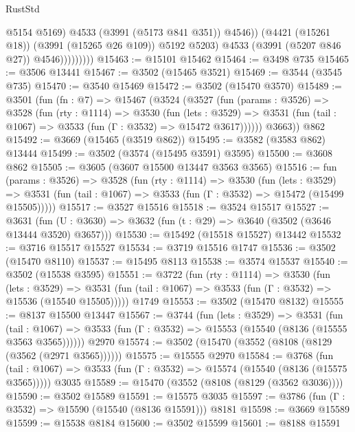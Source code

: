 \begin{lexlean}{RustStd}
\begin{coremodule}
                              @5154
                              @5169)
                            @4533
                            (@3991 (@5173 @841 @351))
                            @4546))
                        (@4421 (@15261 @18))
                        (@3991 (@15265 @26 @109))
                        @5192
                        @5203)
                      @4533
                      (@3991 (@5207 @846 @27))
                      @4546)))))))))
@15463 := @15101 @15462
@15464 := @3498 @735
@15465 := @3506 @13441
@15467 := @3502 (@15465 @3521)
@15469 := @3544 (@3545 @735)
@15470 := @3540 @15469
@15472 := @3502 (@15470 @3570)
@15489 := @3501
    (fun (fn : @7) =>
    @15467
      (@3524
        (@3527
          (fun (params : @3526) =>
          @3528
            (fun (rty : @1114) =>
            @3530
              (fun (lets : @3529) =>
              @3531 (fun (tail : @1067) => @3533 (fun (Γ : @3532) => @15472 @3617))))))
        @3663))
    @862
@15492 := @3669 (@15465 (@3519 @862))
@15495 := @3582 (@3583 @862) @13444
@15499 := @3502 (@3574 (@15495 @3591) @3595)
@15500 := @3608 @862
@15505 := @3605 (@3607 @15500 @13447 @3563 @3565)
@15516 := fun (params : @3526) =>
  @3528
    (fun (rty : @1114) =>
    @3530
      (fun (lets : @3529) =>
      @3531 (fun (tail : @1067) => @3533 (fun (Γ : @3532) => @15472 (@15499 @15505)))))
@15517 := @3527 @15516
@15518 := @3524 @15517
@15527 := @3631
    (fun (U : @3630) => @3632 (fun (t : @29) => @3640 (@3502 (@3646 @13444 @3520) @3657)))
@15530 := @15492 (@15518 @15527) @13442
@15532 := @3716 @15517 @15527
@15534 := @3719 @15516 @1747
@15536 := @3502 (@15470 @8110)
@15537 := @15495 @8113
@15538 := @3574 @15537
@15540 := @3502 (@15538 @3595)
@15551 := @3722
    (fun (rty : @1114) =>
    @3530
      (fun (lets : @3529) =>
      @3531 (fun (tail : @1067) => @3533 (fun (Γ : @3532) => @15536 (@15540 @15505)))))
    @1749
@15553 := @3502 (@15470 @8132)
@15555 := @8137 @15500 @13447
@15567 := @3744
    (fun (lets : @3529) =>
    @3531
      (fun (tail : @1067) =>
      @3533 (fun (Γ : @3532) => @15553 (@15540 (@8136 (@15555 @3563 @3565))))))
    @2970
@15574 := @3502 (@15470 (@3552 (@8108 (@8129 (@3562 (@2971 @3565))))))
@15575 := @15555 @2970
@15584 := @3768
    (fun (tail : @1067) => @3533 (fun (Γ : @3532) => @15574 (@15540 (@8136 (@15575 @3565)))))
    @3035
@15589 := @15470 (@3552 (@8108 (@8129 (@3562 @3036))))
@15590 := @3502 @15589
@15591 := @15575 @3035
@15597 := @3786 (fun (Γ : @3532) => @15590 (@15540 (@8136 @15591))) @8181
@15598 := @3669 @15589
@15599 := @15538 @8184
@15600 := @3502 @15599
@15601 := @8188 @15591

\end{coremodule}
\end{lexlean}
